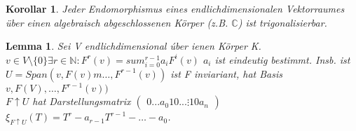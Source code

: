 \documentclass{report}
\newcommand{\N}{\mathbb{N}}
\newcommand{\C}{\mathbb{C}}
\theoremstyle{customrem}
\theoremstyle{customdef}
\newtheorem{lemma}[definition]{Lemma}
\newtheorem{korrolar}[definition]{Korollar}
\theoremstyle{customenv}
\begin{document}
\begin{korrolar}
  Jeder Endomorphismus eines endlichdimensionalen Vektorraumes \"uber einen
  algebraisch abgeschlossenen K\"orper (z.B. \(\C\)) ist trigonalisierbar.
\end{korrolar}

\begin{lemma}
  Sei V endlichdimensional \'uber ienen K\"orper K.\\
  \(v \in V \setminus \{0\} \exists r \in \N : F^r(v) = sum_{i=0}^{r-1}a_i F^i(v)\) \(a_i\) ist eindeutig bestimmt.
  Insb. ist \(U = Span(v, F(v)m \dots, F^{r-1}(v))\) ist F inviariant, hat Basis \(v, F(V), \dots, F^{r-1}(v))\)\\
  \(F \uparrow U\) hat Darstellungsmatrix
  \(
  \begin{pmatrix}
  0     ... a_0
  1 0   ... \vdots
    1 0     a_n
  \end{pmatrix}
  \)
  \(\xi_{F \uparrow U}(T) = T^r - a_{r-1} T^{r-1} - \dots - a_0\).
  

\end{lemma}
\end{document}
